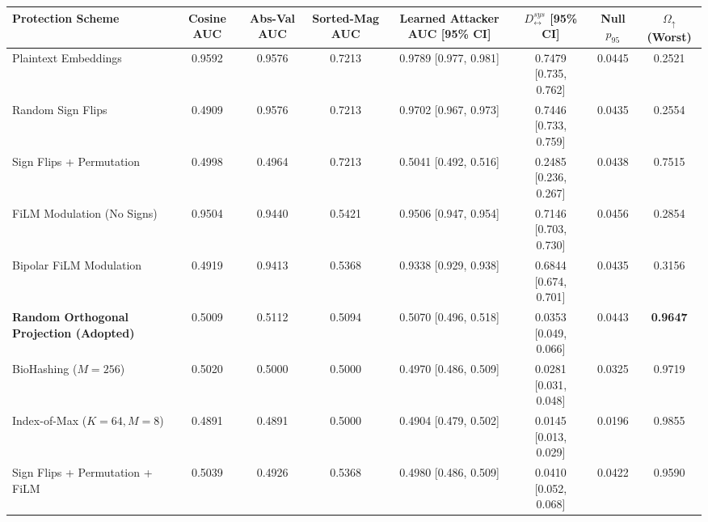 \begin{tabular}{lccccccc}
\toprule
\textbf{Protection Scheme} & \textbf{Cosine AUC} & \textbf{Abs-Val AUC} & \textbf{Sorted-Mag AUC} & \textbf{Learned Attacker AUC [95\% CI]} & \textbf{$D_{\leftrightarrow}^{\mathit{sys}}$ [95\% CI]} & \textbf{Null $p_{95}$} & \textbf{$\Omega_{\uparrow}$ (Worst)} \\
\midrule
Plaintext Embeddings & 0.9592 & 0.9576 & 0.7213 & 0.9789 \scriptsize{[0.977, 0.981]} & 0.7479 \scriptsize{[0.735, 0.762]} & 0.0445 & 0.2521 \\
Random Sign Flips & 0.4909 & 0.9576 & 0.7213 & 0.9702 \scriptsize{[0.967, 0.973]} & 0.7446 \scriptsize{[0.733, 0.759]} & 0.0435 & 0.2554 \\
Sign Flips + Permutation & 0.4998 & 0.4964 & 0.7213 & 0.5041 \scriptsize{[0.492, 0.516]} & 0.2485 \scriptsize{[0.236, 0.267]} & 0.0438 & 0.7515 \\
FiLM Modulation (No Signs) & 0.9504 & 0.9440 & 0.5421 & 0.9506 \scriptsize{[0.947, 0.954]} & 0.7146 \scriptsize{[0.703, 0.730]} & 0.0456 & 0.2854 \\
Bipolar FiLM Modulation & 0.4919 & 0.9413 & 0.5368 & 0.9338 \scriptsize{[0.929, 0.938]} & 0.6844 \scriptsize{[0.674, 0.701]} & 0.0435 & 0.3156 \\
\textbf{Random Orthogonal Projection (Adopted)} & 0.5009 & 0.5112 & 0.5094 & 0.5070 \scriptsize{[0.496, 0.518]} & 0.0353 \scriptsize{[0.049, 0.066]} & 0.0443 & \textbf{0.9647} \\
BioHashing ($M=256$) & 0.5020 & 0.5000 & 0.5000 & 0.4970 \scriptsize{[0.486, 0.509]} & 0.0281 \scriptsize{[0.031, 0.048]} & 0.0325 & 0.9719 \\
Index-of-Max ($K=64, M=8$) & 0.4891 & 0.4891 & 0.5000 & 0.4904 \scriptsize{[0.479, 0.502]} & 0.0145 \scriptsize{[0.013, 0.029]} & 0.0196 & 0.9855 \\
Sign Flips + Permutation + FiLM & 0.5039 & 0.4926 & 0.5368 & 0.4980 \scriptsize{[0.486, 0.509]} & 0.0410 \scriptsize{[0.052, 0.068]} & 0.0422 & 0.9590 \\
\bottomrule
\end{tabular}